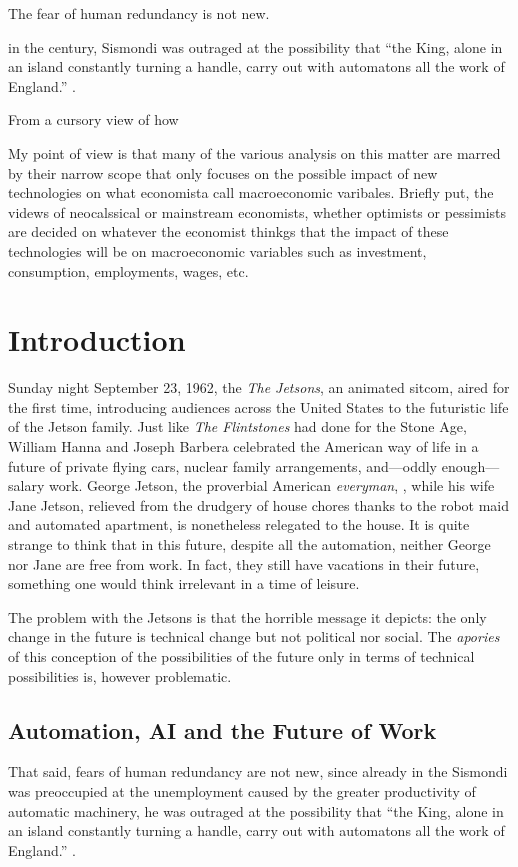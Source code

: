 \documentclass[version=last,draft=true,paper=A4,portrait,twoside=true,twocolumn=false,headinclude=false,footinclude=false,fontsize=12,BCOR=20mm,DIV=calc,pagesize=auto,titlepage=firstiscover,mpinclude=true,open=right,chapterprefix=true,numbers=autoendperiod,headsepline=false,headings=twolinechapter,parskip=false]{scrbook}
\begin{document}
The fear of human redundancy is not new. 

 in the  century, Sismondi was outraged at the
possibility that ``the King, alone in an island constantly turning a
handle, carry out with automatons all the work of England.''
\cite[p. 330, my translation]{sismondi1819_2}.

From a cursory view of how 


My point of view is that many of the various analysis on this matter are
marred by their narrow scope that only focuses on the possible impact of
new technologies on what economista call macroeconomic varibales. Briefly
put, the videws of neocalssical or mainstream economists, whether optimists
or pessimists are decided on whatever the economist thinkgs that the impact
of these technologies will be on macroeconomic variables such as
investment, consumption, employments, wages, etc.


\chapter{Introduction}
\label{sec:org954f451}
Sunday night September 23, 1962, the \emph{The Jetsons}, an animated sitcom, aired
for the first time, introducing audiences across the United States to the
futuristic life of the Jetson family. Just like \emph{The Flintstones} had done
for the Stone Age, William Hanna and Joseph Barbera celebrated the American
way of life in a future of private flying cars, nuclear family
arrangements, and---oddly enough---salary work. George Jetson, the
proverbial American \emph{everyman}, , while his wife Jane Jetson, relieved from
the drudgery of house chores thanks to the robot maid and automated
apartment, is nonetheless relegated to the house. It is quite strange to
think that in this future, despite all the automation, neither George nor
Jane are free from work. In fact, they still have vacations in their
future, something one would think irrelevant in a time of leisure.

The problem with the Jetsons is that the horrible message it depicts: the
only change in the future is technical change but not political nor social.
The \emph{apories} of this conception of the possibilities of the future only in
terms of technical possibilities is, however  problematic. 
\section{Automation, AI and the Future of Work}
\label{sec:org475337e}
That said, fears of human redundancy are not new, since already in the
 Sismondi was preoccupied at the unemployment caused by the
greater productivity of automatic machinery, he was outraged at the
possibility that ``the King, alone in an island constantly turning a
handle, carry out with automatons all the work of England.''
\cite[p. 330, my translation]{sismondi1819_2}.
\end{document}
